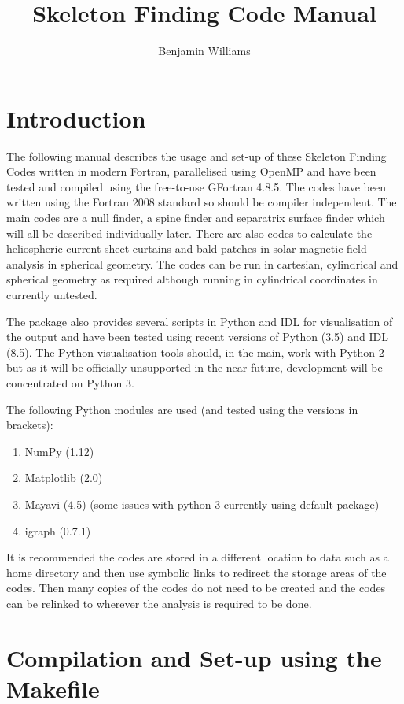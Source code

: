 \documentclass[12pt]{article}
\author{Benjamin Williams}
\title{Skeleton Finding Code Manual}
\begin{document}
  \maketitle

  \section{Introduction}

    The following manual describes the usage and set-up of these Skeleton Finding Codes written in modern Fortran, parallelised using OpenMP and have been tested and compiled using the free-to-use GFortran 4.8.5. The codes have been written using the Fortran 2008 standard so should be compiler independent. The main codes are a null finder, a spine finder and separatrix surface finder which will all be described individually later. There are also codes to calculate the heliospheric current sheet curtains and bald patches in solar magnetic field analysis in spherical geometry. The codes can be run in cartesian, cylindrical and spherical geometry as required although running in cylindrical coordinates in currently untested.
    
    The package also provides several scripts in Python and IDL for visualisation of the output and have been tested using recent versions of Python (3.5) and IDL (8.5). The Python visualisation tools should, in the main, work with Python 2 but as it will be officially unsupported in the near future, development will be concentrated on Python 3.

    The following Python modules are used (and tested using the versions in brackets):
    \begin{enumerate}
      \item NumPy (1.12)
      \item Matplotlib (2.0)
      \item Mayavi (4.5) (some issues with python 3 currently using default package)
      \item igraph (0.7.1)
    \end{enumerate}
    
    It is recommended the codes are stored in a different location to data such as a home directory and then use symbolic links to redirect the storage areas of the codes. Then many copies of the codes do not need to be created and the codes can be relinked to wherever the analysis is required to be done. 

    \section{Compilation and Set-up using the Makefile}
\end{document}

